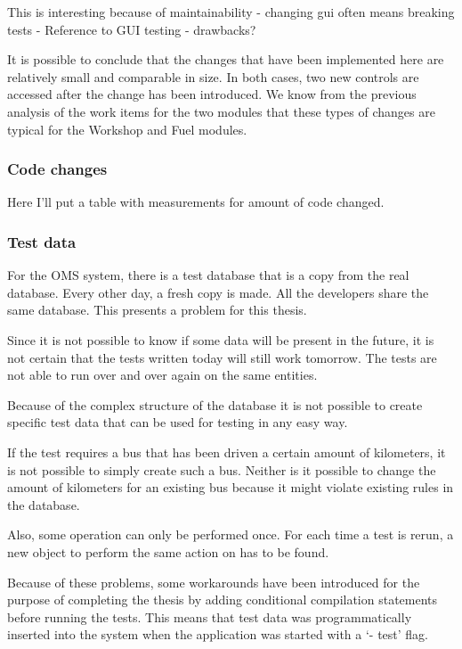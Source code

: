 \documentclass{article}
\begin{document}
			 This is interesting because of maintainability - changing gui often means breaking tests - Reference to GUI testing - drawbacks?

			 It is possible to conclude that the changes that have been implemented here are relatively small and comparable in size. In both cases, two new controls are accessed after the change has been introduced. We know from the previous analysis of the work items for the two modules that these types of changes are typical for the Workshop and Fuel modules.

			 \subsubsection{Code changes}

			 Here I'll put a table with measurements for amount of code changed.

			 \subsubsection{Test data}
			 For the OMS system, there is a test database that is a copy from the real database. Every other day, a fresh copy is made. All the developers share the same database. This presents a problem for this thesis. 

			 Since it is not possible to know if some data will be present in the future, it is not certain that the tests written today will still work tomorrow. The tests are not able to run over and over again on the same entities. 

			 Because of the complex structure of the database it is not possible to create specific test data that can be used for testing in any easy way.

			 If the test requires a bus that has been driven a certain amount of kilometers, it is not possible to simply create such a bus. Neither is it possible to change the amount of kilometers for an existing bus because it might violate existing rules in the database. 

			 Also, some operation can only be performed once. For each time a test is rerun, a new object to perform the same action on has to be found.

			 Because of these problems, some workarounds have been introduced for the purpose of completing the thesis by adding conditional compilation statements before running the tests. This means that test data was programmatically inserted into the system when the application was started with a `- test' flag. 
\end{document}
